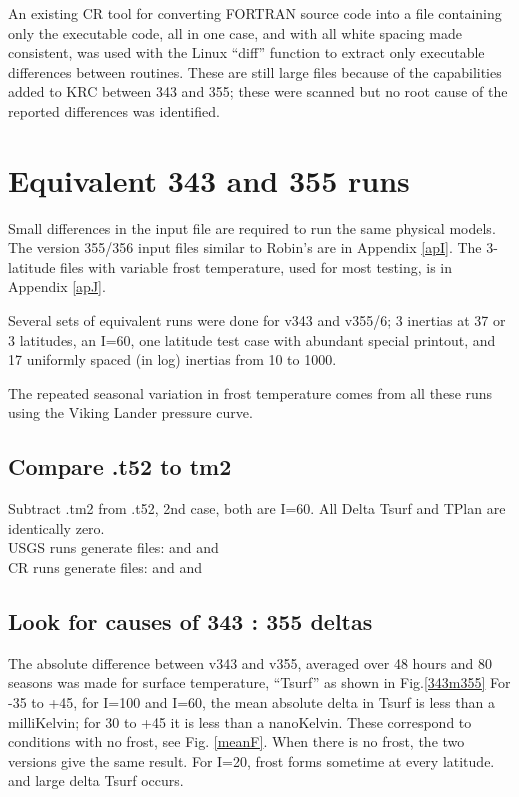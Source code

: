 \documentclass{article}
\begin{document}
An existing CR tool for converting FORTRAN source code into a file containing
only the executable code, all in one case, and with all white spacing made
consistent, was used with the Linux ``diff'' function to extract only executable
differences between routines. These are still large files because of the
capabilities added to KRC between 343 and 355; these were scanned but no root
cause of the reported differences was identified.
\section{Equivalent 343 and 355 runs}
Small differences in the input file are required to run the same physical
models.  The version 355/356 input files similar to Robin's are in Appendix
\ref{apI}. The 3-latitude files with variable frost temperature, used for most
testing, is in Appendix \ref{apJ}.

Several sets of equivalent runs were done for v343 and v355/6; 3 inertias at 37
or 3 latitudes, an I=60, one latitude test case with abundant special printout,
and 17 uniformly spaced (in log) inertias from 10 to 1000.

The repeated seasonal variation in frost temperature comes from all these runs using the Viking Lander pressure curve. 

\subsection{Compare .t52 to tm2} %
Subtract .tm2 from .t52, 2nd case, both are I=60.  All  Delta Tsurf and TPlan are identically zero.
\\ USGS runs generate files:
\qi {} and  %
\qi {} and  %
\\ CR runs generate files:
\qi {} and  %
\qi {} and  %

\subsection{Look for causes of 343 : 355 deltas} %

The absolute difference between v343 and v355, averaged over 48 hours and 80
seasons was made for surface temperature, ``Tsurf'' as shown in
Fig.\ref{343m355} For -35 to +45, for I=100 and I=60, the mean absolute delta in
Tsurf is less than a milliKelvin; for 30 to +45 it is less than a
nanoKelvin. These correspond to conditions with no frost, see
Fig. \ref{meanF}. When there is no frost, the two versions give the same
result. For I=20, frost forms sometime at every latitude. and large delta Tsurf
occurs.
\end{document}
